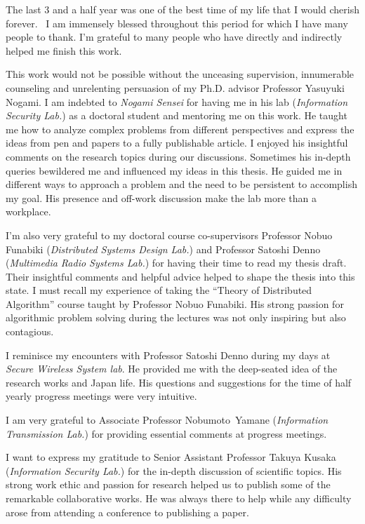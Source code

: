 The last 3 and a half year was one of the best time of my life that I would cherish forever. 
I am immensely blessed throughout this period for which I have many people to thank.
I'm grateful to many people who have directly and indirectly helped me finish this work.


This work would not be possible without the unceasing supervision, innumerable counseling and unrelenting persuasion of my Ph.D. advisor Professor Yasuyuki Nogami.
I am indebted to \textit{Nogami Sensei} for having me in his lab (\textit{Information Security Lab.}) as a doctoral student and mentoring me on this work.
He taught me how to analyze complex problems from different perspectives and express the ideas from pen and papers to a fully publishable article.
I enjoyed his insightful comments on the research topics during our discussions.
Sometimes his in-depth queries bewildered me and influenced my ideas in this thesis.
He guided me in different ways to approach a problem and the need to be persistent to accomplish my goal.
His presence and off-work discussion make the lab more than a workplace. 


I’m also very grateful to my doctoral course co-supervisors Professor Nobuo Funabiki (\textit{Distributed Systems Design Lab.}) and Professor Satoshi Denno (\textit{Multimedia Radio Systems Lab.}) for having their time to read my thesis draft.
Their insightful comments and helpful advice helped to shape the thesis into this state.
I must recall my experience of taking the “Theory of Distributed Algorithm” course taught by Professor Nobuo Funabiki.
His strong passion for algorithmic problem solving during the lectures was not only inspiring but also contagious. 


I reminisce my encounters with Professor Satoshi Denno during my days at \textit{Secure Wireless System lab}.
He provided me with the deep-seated idea of the research works and Japan life.
His questions and suggestions for the time of half yearly progress meetings were very intuitive. 


I am very grateful to Associate Professor \mbox{Nobumoto Yamane} (\textit{Information Transmission Lab.}) for providing essential comments at progress meetings.


I want to express my gratitude to Senior Assistant Professor Takuya Kusaka (\textit{Information Security Lab.}) for the in-depth discussion of scientific topics.
His strong work ethic and passion for research helped us to publish some of the remarkable collaborative works. 
He was always there to help while any difficulty arose from attending a conference to publishing a paper.  


